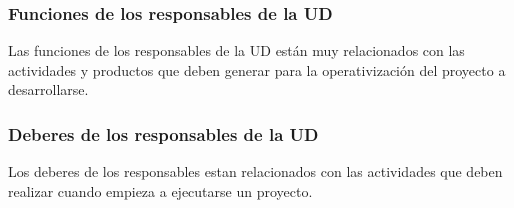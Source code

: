 \documentclass{article}
\begin{document}
\subsubsection{Funciones de los responsables de la UD}

Las funciones de los responsables de la UD están muy relacionados con las actividades y productos que deben generar para la operativización del proyecto a desarrollarse. 

\subsubsection{Deberes de los responsables de la UD}

Los deberes de los responsables estan relacionados con las actividades que deben realizar cuando empieza a ejecutarse un proyecto.
\end{document}
